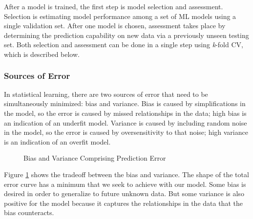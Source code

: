 After a model is trained, the first step is model selection and assessment.
Selection is estimating model performance among a set of \gls{ML} models using
a single validation set.  After one model is chosen, assessment takes place by
determining the prediction capability on new data via a previously unseen
testing set. Both selection and assessment can be done in a single step using
\textit{k}-fold \gls{CV}, which is described below.

\subsubsection{Sources of Error} 

In statistical learning, there are two sources of error that need to be
simultaneously minimized: bias and variance. Bias is caused by simplifications
in the model, so the error is caused by missed relationships in the data; high
bias is an indication of an underfit model.  Variance is caused by including
random noise in the model, so the error is caused by oversensitivity to that
noise; high variance is an indication of an overfit model. 

\begin{figure}[!htb]
  \caption{Bias and Variance Comprising Prediction Error}
  \label{fig:bvtradeoff}
\end{figure}

Figure \ref{fig:bvtradeoff} shows the tradeoff between the bias and variance.
The shape of the total error curve has a minimum that we seek to achieve with
our model. Some bias is desired in order to generalize to future unknown data.
But some variance is also positive for the model because it captures the
relationships in the data that the bias counteracts. 

